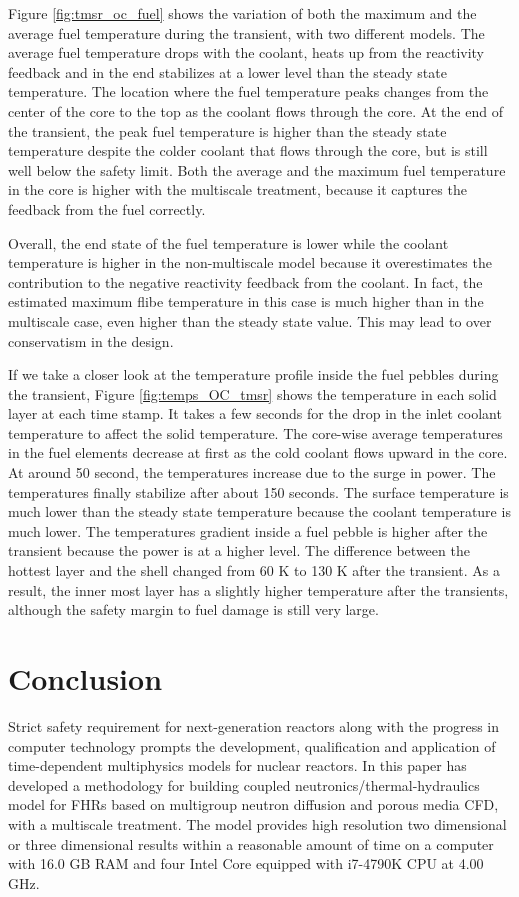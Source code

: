 \documentclass{elsarticle}
\begin{document}
Figure \ref{fig:tmsr_oc_fuel} shows the variation of both the maximum and the average fuel temperature during the transient, with two different models.
The average fuel temperature drops with the coolant, heats up from the reactivity feedback and in the end stabilizes at a lower level than the steady state temperature.
The location where the fuel temperature peaks changes from the center of the core to the top as the coolant flows through the core. At the end of the transient, the peak fuel temperature is higher than the steady state temperature despite the colder coolant that flows through the core, but is still well below the safety limit. 
Both the average and the maximum fuel temperature in the core is higher with the multiscale treatment, because it captures the feedback from the fuel correctly. 

Overall, the end state of the fuel temperature is lower while the coolant temperature is higher in the non-multiscale model because it overestimates the contribution to the negative reactivity feedback from the coolant. 
In fact, the estimated maximum flibe temperature in this case is much higher than in the multiscale case, even higher than the steady state value. This may lead to over conservatism in the design. 


If we take a closer look at the temperature profile inside the fuel pebbles during the transient, Figure \ref{fig:temps_OC_tmsr} shows the temperature in each solid layer at each time stamp.
It takes a few seconds for the drop in the inlet coolant temperature to affect the solid temperature. The core-wise average temperatures in the fuel elements decrease at first as the cold coolant flows upward in the core.
At around 50 second, the temperatures increase due to the surge in power. The temperatures finally stabilize after about 150 seconds. The surface temperature is much lower than the steady state temperature because the coolant temperature is much lower.
The temperatures gradient inside a fuel pebble is higher after the transient because the power is at a higher level. The difference between the hottest layer and the shell changed from 60 K to 130 K after the transient. As a result, the inner most layer has a slightly higher temperature after the transients, although the safety margin to fuel damage is still very large. 


\section{Conclusion}
Strict safety requirement for next-generation reactors along with the progress in computer technology prompts the development, qualification and application of time-dependent multiphysics models for nuclear reactors.
In this paper has developed a methodology for building coupled neutronics/thermal-hydraulics model for FHRs based on multigroup neutron diffusion and porous media CFD, with a multiscale treatment. The model provides high resolution two dimensional or three dimensional results within a reasonable amount of time on a computer with 16.0 GB RAM and four Intel Core equipped with i7-4790K CPU at 4.00 GHz.
\end{document}
